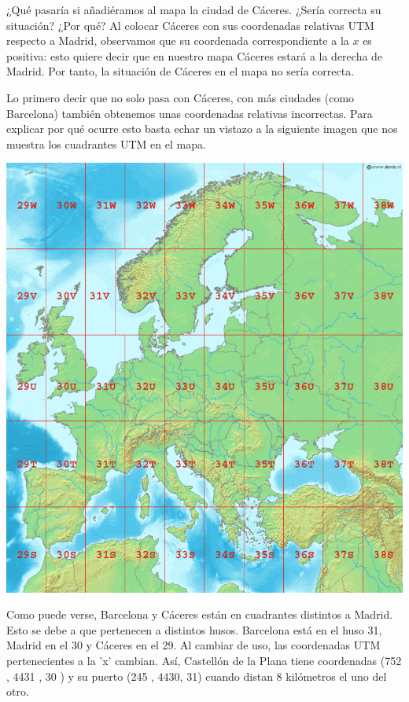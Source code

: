 \documentclass[11pt, a4paper, spanish, openright, twoside]{book}
\begin{document}
	\begin{section}{ ¿Qué pasaría si añadiéramos al mapa la ciudad de Cáceres. ¿Sería correcta su situación? ¿Por qué?}
		Al colocar Cáceres con sus coordenadas relativas UTM respecto a Madrid, observamos que su coordenada correspondiente 
		a la $x$ es positiva: esto quiere decir que en nuestro mapa Cáceres estará a la derecha de Madrid. Por tanto, la situación de Cáceres 
		en el mapa no sería correcta.

		Lo primero decir que no solo pasa con Cáceres,  con más ciudades (como Barcelona) también obtenemos unas coordenadas relativas incorrectas. Para explicar por qué ocurre esto basta echar un vistazo a la siguiente imagen que nos muestra los cuadrantes UTM en
		el mapa.

	\begin{center}
		\includegraphics[scale=0.45]{mapaUTM}
	\end{center}

		Como puede verse, Barcelona y Cáceres están en cuadrantes distintos a Madrid.
		Esto se debe a que pertenecen a distintos husos. Barcelona está en el huso 31, Madrid en el 30 y Cáceres en el 29. Al cambiar de uso, 
		las coordenadas UTM pertenecientes a la 'x' cambian. Así, Castellón de la Plana tiene coordenadas (752 ,  4431 ,  30 ) y su puerto (245  ,  4430, 31) 
		cuando distan 8 kilómetros el uno del otro.

	\end{section}
\end{document}
